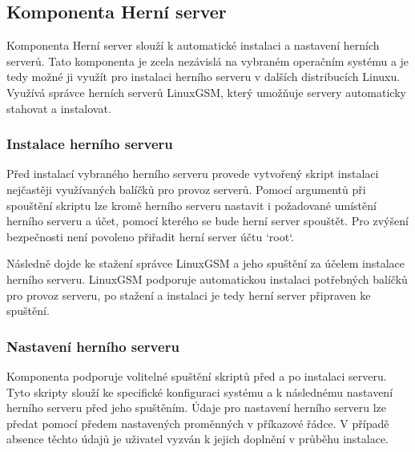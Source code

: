 \subsection{Komponenta Herní server}

Komponenta Herní server slouží k automatické instalaci a nastavení herních serverů. Tato komponenta je zcela nezávislá na
vybraném operačním systému a je tedy možné ji využít pro instalaci herního serveru v dalších distribucích Linuxu.
Využívá správce herních serverů LinuxGSM, který umožňuje servery automaticky stahovat a instalovat.

\subsubsection{Instalace herního serveru}

Před instalací vybraného herního serveru provede vytvořený skript instalaci nejčastěji využívaných balíčků pro provoz serverů.
Pomocí argumentů při spouštění skriptu lze kromě herního serveru nastavit i požadované umístění herního serveru a účet, pomocí kterého
se bude herní server spouštět. Pro zvýšení bezpečnosti není povoleno přiřadit herní server účtu `root`.

Následně dojde ke stažení správce LinuxGSM a jeho spuštění za účelem instalace herního serveru. LinuxGSM podporuje automatickou instalaci
potřebných balíčků pro provoz serveru, po stažení a instalaci je tedy herní server připraven ke spuštění.

\subsubsection{Nastavení herního serveru}

Komponenta podporuje volitelné spuštění skriptů před a po instalaci serveru. Tyto skripty slouží
ke specifické konfiguraci systému a k následnému nastavení herního serveru před jeho spuštěním.
Údaje pro nastavení herního serveru lze předat pomocí předem nastavených proměnných v příkazové řádce. V případě absence těchto údajů
je uživatel vyzván k jejich doplnění v průběhu instalace.